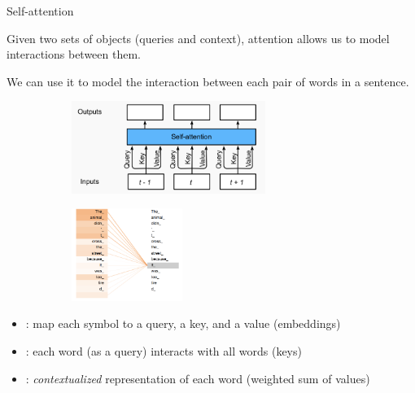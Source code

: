 \documentclass[usenames,dvipsnames,notes,11pt,aspectratio=169,hyperref={colorlinks=true, linkcolor=blue}]{beamer}
\begin{document}
\begin{frame}
    {Self-attention}

    Given two sets of objects (queries and context), attention allows us to model interactions between them.

    We can use it to model the interaction between each pair of words in a sentence.
    \pause

    \begin{figure}
        \begin{subfigure}{.5\textwidth}
        \includegraphics[height=3cm]{figures/self-attn}
        \end{subfigure}
        \begin{subfigure}{.4\textwidth}
        \includegraphics[height=3cm]{figures/self-attn-ex}
        \end{subfigure}
    \end{figure}
    \begin{itemize}[<+->]
        \item {}: map each symbol to a query, a key, and a value (embeddings)
        \item {}: each word (as a query) interacts with all words (keys)
        \item {}: \emph{contextualized} representation of each word (weighted sum of values)
    \end{itemize}
\end{frame}
\end{document}
